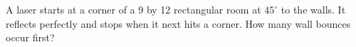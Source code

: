 A laser starts at a corner of a 9 by 12 rectangular room at $45^\circ$ to the walls. It reflects perfectly and stops when it next hits a corner. How many wall bounces occur first?
